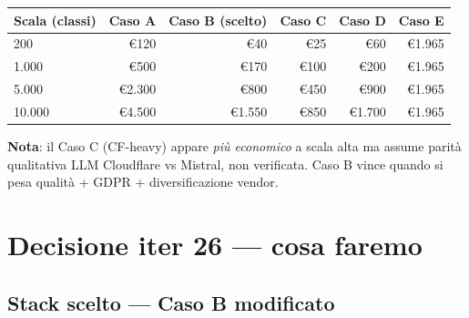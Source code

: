 \documentclass[12pt,a4paper]{article}
\begin{document}
\begin{center}
\renewcommand{\arraystretch}{1.2}
\begin{tabular}{l r r r r r}
\toprule
\textbf{Scala (classi)} & \textbf{Caso A} & \textbf{Caso B (scelto)} & \textbf{Caso C} & \textbf{Caso D} & \textbf{Caso E} \\
\midrule
200    & €120 & \cellcolor{elablime!20}€40  & €25  & €60  & €1.965 \\
1.000  & €500 & \cellcolor{elablime!20}€170 & €100 & €200 & €1.965 \\
5.000  & €2.300 & \cellcolor{elablime!20}€800 & €450 & €900 & €1.965 \\
10.000 & €4.500 & \cellcolor{elablime!20}€1.550 & €850 & €1.700 & €1.965 \\
\bottomrule
\end{tabular}
\end{center}

\textbf{Nota}: il Caso C (CF-heavy) appare \emph{più economico} a scala alta ma assume parità qualitativa LLM Cloudflare vs Mistral, non verificata. Caso B vince quando si pesa qualità + GDPR + diversificazione vendor.

\newpage

\section{Decisione iter 26 --- cosa faremo}

\subsection{Stack scelto --- Caso B modificato}
\end{document}
